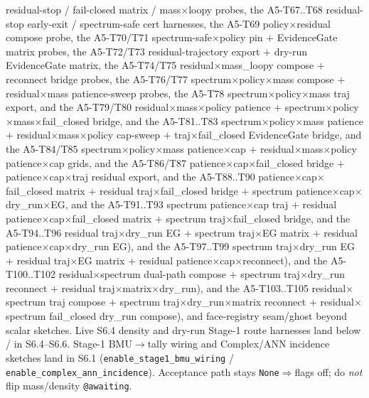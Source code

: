 \documentclass[11pt]{article}
\begin{document}
residual-stop / fail-closed matrix / mass$\times$loopy probes, the
A5-T67..T68 residual-stop early-exit / spectrum-safe cert harnesses,
the A5-T69 policy$\times$residual compose probe, the A5-T70/T71
spectrum-safe$\times$policy pin $+$ EvidenceGate matrix probes, the
A5-T72/T73 residual-trajectory export $+$ dry-run EvidenceGate matrix,
the A5-T74/T75 residual$\times$mass\_loopy compose $+$ reconnect
bridge probes, the A5-T76/T77 spectrum$\times$policy$\times$mass
compose $+$ residual$\times$mass patience-sweep probes, the
A5-T78 spectrum$\times$policy$\times$mass traj export, and the
A5-T79/T80 residual$\times$mass$\times$policy patience $+$
spectrum$\times$policy$\times$mass$\times$fail\_closed bridge, and the
A5-T81..T83 spectrum$\times$policy$\times$mass patience $+$
residual$\times$mass$\times$policy cap-sweep $+$
traj$\times$fail\_closed EvidenceGate bridge, and the
A5-T84/T85 spectrum$\times$policy$\times$mass patience$\times$cap $+$
residual$\times$mass$\times$policy patience$\times$cap grids, and the
A5-T86/T87 patience$\times$cap$\times$fail\_closed bridge $+$
patience$\times$cap$\times$traj residual export, and the
A5-T88..T90 patience$\times$cap$\times$fail\_closed matrix $+$
residual traj$\times$fail\_closed bridge $+$ spectrum
patience$\times$cap$\times$dry\_run$\times$EG, and the
A5-T91..T93 spectrum patience$\times$cap traj $+$ residual
patience$\times$cap$\times$fail\_closed matrix $+$ spectrum
traj$\times$fail\_closed bridge, and the
A5-T94..T96 residual traj$\times$dry\_run EG $+$ spectrum
traj$\times$EG matrix $+$ residual patience$\times$cap$\times$dry\_run EG), and the
A5-T97..T99 spectrum traj$\times$dry\_run EG $+$ residual
traj$\times$EG matrix $+$ residual patience$\times$cap$\times$reconnect), and the
A5-T100..T102 residual$\times$spectrum dual-path compose $+$ spectrum
traj$\times$dry\_run reconnect $+$ residual traj$\times$matrix$\times$dry\_run), and the
A5-T103..T105 residual$\times$spectrum traj compose $+$ spectrum
traj$\times$dry\_run$\times$matrix reconnect $+$ residual$\times$spectrum
fail\_closed dry\_run compose), and
face-registry seam/ghost beyond scalar sketches. Live S6.4 density and
dry-run Stage-1 route harnesses land below / in S6.4--S6.6. Stage-1
BMU$\to$tally wiring and Complex/ANN incidence sketches land in S6.1
(\texttt{enable\_stage1\_bmu\_wiring} /
\texttt{enable\_complex\_ann\_incidence}). Acceptance path stays
\texttt{None}$\Rightarrow$flags off; do \emph{not} flip mass/density
\texttt{@awaiting}.
\end{document}
